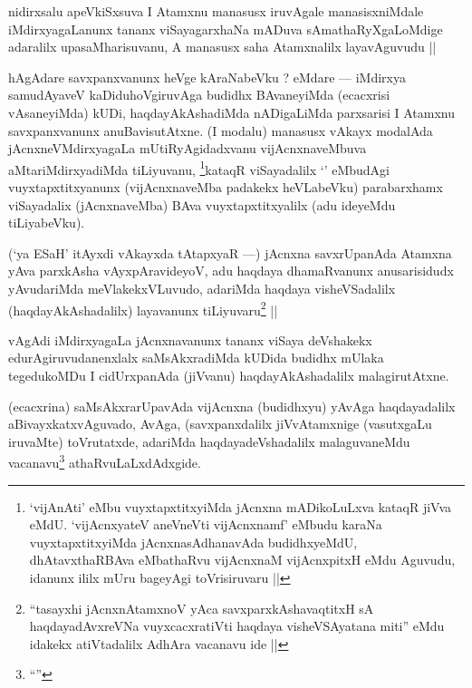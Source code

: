 \begin{artha}
nidirxsalu apeVkiSxsuva I Atamxnu manasusx iruvAgale manasisxniMdale iMdirxyagaLanunx tananx viSayagarxhaNa mADuva sAmathaRyXgaLoMdige adaralilx upasaMharisuvanu, A manasusx saha Atamxnalilx layavAguvudu ||
\end{artha}

\begin{artha}
hAgAdare savxpanxvanunx heVge kAraNabeVku ? eMdare --- iMdirxya samudAyaveV kaDiduhoVgiruvAga budidhx BAvaneyiMda (ecacxrisi vAsaneyiMda) kUDi, haqdayAkAshadiMda nADigaLiMda parxsarisi I Atamxnu savxpanxvanunx anuBavisutAtxne. (I modalu) manasusx vAkayx modalAda jAcnxneVMdirxyagaLa mUtiRyAgidadxvanu vijAcnxnaveMbuva aMtariMdirxyadiMda tiLiyuvanu, \footnote{`vijAnAti' eMbu vuyxtapxtitxyiMda jAcnxna mADikoLuLxva kataqR jiVva eMdU. `vijAcnxyateV aneVneVti vijAcnxnamf' eMbudu karaNa vuyxtapxtitxyiMda jAcnxnasAdhanavAda budidhxyeMdU, dhAtavxthaRBAva eMbathaRvu vijAcnxnaM vijAcnxpitxH eMdu Aguvudu, idanunx ililx mUru bageyAgi toVrisiruvaru ||}kataqR viSayadalilx `\stext' eMbudAgi vuyxtapxtitxyanunx (vijAcnxnaveMba padakekx heVLabeVku) parabarxhamx viSayadalix (jAcnxnaveMba) BAva vuyxtapxtitxyalilx (adu ideyeMdu tiLiyabeVku).
\end{artha}

\begin{artha}
(`ya ESaH' itAyxdi vAkayxda tAtapxyaR ---) jAcnxna savxrUpanAda Atamxna yAva parxkAsha vAyxpAravideyoV, adu haqdaya dhamaRvanunx anusarisidudx yAvudariMda meVlakekxVLuvudo, adariMda haqdaya visheVSadalilx (haqdayAkAshadalilx) layavanunx tiLiyuvaru\footnote{``tasayxhi jAcnxnAtamxnoV yAca savxparxkAshavaqtitxH sA haqdayadAvxreVNa vuyxcacxratiVti haqdaya visheVSAyatana miti'' eMdu idakekx atiVtadalilx AdhAra vacanavu ide ||} ||
\end{artha}

\begin{artha}
vAgAdi iMdirxyagaLa jAcnxnavanunx tananx viSaya deVshakekx edurAgiruvudanenxlalx saMsAkxradiMda kUDida budidhx mUlaka tegedukoMDu I cidUrxpanAda (jiVvanu) haqdayAkAshadalilx malagirutAtxne.
\end{artha}

\begin{artha}
(ecacxrina) saMsAkxrarUpavAda vijAcnxna (budidhxyu) yAvAga haqdayadalilx aBivayxkatxvAguvado, AvAga, (savxpanxdalilx jiVvAtamxnige (vasutxgaLu iruvaMte) toVrutatxde, adariMda haqdayadeVshadalilx malaguvaneMdu vacanavu\footnote{``\stext''} athaRvuLaLxdAdxgide.
\end{artha}

